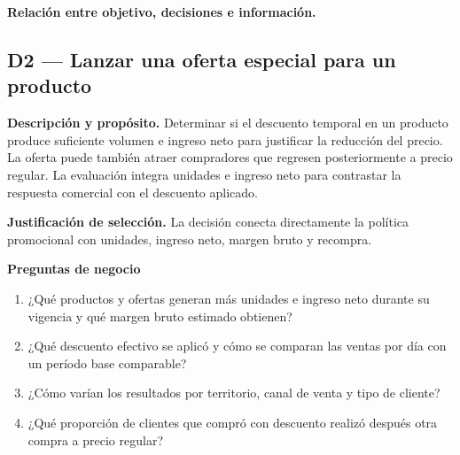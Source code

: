 \documentclass[10pt,a4paper]{article}
\begin{document}
\textbf{Relación entre objetivo, decisiones e información.}
\begin{center}
\end{center}

\subsection*{D2 — Lanzar una oferta especial para un producto}

\textbf{Descripción y propósito.} Determinar si el descuento temporal en un
producto produce suficiente volumen e ingreso neto para justificar la
reducción del precio. La oferta puede también atraer compradores que regresen
posteriormente a precio regular. La evaluación integra unidades e ingreso neto para contrastar la respuesta
comercial con el descuento aplicado.

\textbf{Justificación de selección.} La decisión conecta directamente la
política promocional con unidades, ingreso neto, margen bruto y recompra.

\textbf{Preguntas de negocio}
\begin{enumerate}
  \item ¿Qué productos y ofertas generan más unidades e ingreso neto durante
  su vigencia y qué margen bruto estimado obtienen?
  \item ¿Qué descuento efectivo se aplicó y cómo se comparan las ventas por
  día con un período base comparable?
  \item ¿Cómo varían los resultados por territorio, canal de venta y tipo de
  cliente?
  \item ¿Qué proporción de clientes que compró con descuento realizó después
  otra compra a precio regular?
\end{enumerate}
\end{document}

